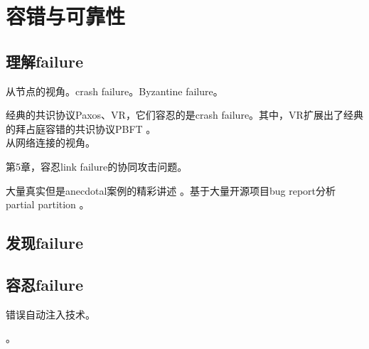 \chapter{容错与可靠性}

\section{理解failure}

从节点的视角。crash failure。Byzantine failure。

\myleaf 经典的共识协议Paxos\cite{Lamport01}、VR\cite{Oki88}，它们容忍的是crash failure。其中，VR扩展出了经典的拜占庭容错的共识协议PBFT \cite{Castro02}。\\


从网络连接的视角。

\myleaf \cite{Lynch96-textbook}第5章，容忍link failure的协同攻击问题。

\myleaf 大量真实但是anecdotal案例的精彩讲述 \cite{Bailis14-cacm}。基于大量开源项目bug report分析partial partition \cite{Alfatafta20}。

\section{发现failure}

\section{容忍failure}

错误自动注入技术。

\myleaf \cite{Alvaro18}。